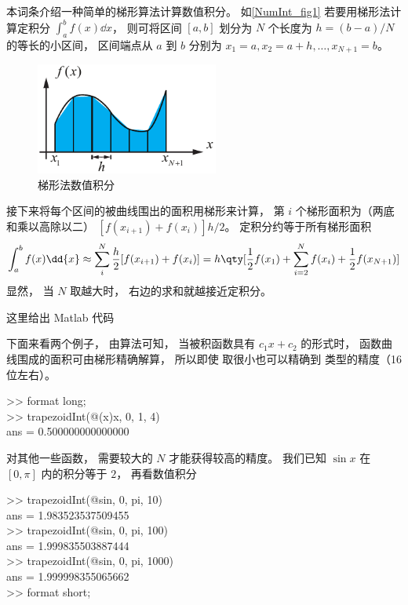 

本词条介绍一种简单的梯形算法计算数值积分。 如\autoref{NumInt_fig1} 若要用梯形法计算定积分 $\int_a^b f(x) \dd{x}$， 则可将区间 $[a, b]$ 划分为 $N$ 个长度为 $h = (b-a)/N$ 的等长的小区间， 区间端点从 $a$ 到 $b$ 分别为 $x_1 = a, x_2 = a + h, \dots, x_{N+1} = b$。

\begin{figure}[ht]
\centering
\includegraphics[width=6cm]{./figures/NumInt1.pdf}
\caption{梯形法数值积分} \label{NumInt_fig1}
\end{figure}

接下来将每个区间的被曲线围出的面积用梯形来计算， 第 $i$ 个梯形面积为（两底和乘以高除以二）
$[f(x_{i+1}) + f(x_i)]h/2$。 定积分约等于所有梯形面积
\begin{equation}
\int_a^b f(x) \dd{x} \approx \sum_i^N  \frac h2 [f(x_{i+1}) + f(x_i)]
= h\qty[ \frac12 f(x_1) + \sum_{i = 2}^N f(x_i) + \frac12 f(x_{N+1})]
\end{equation}
显然， 当 $N$ 取越大时， 右边的求和就越接近定积分。

这里给出 Matlab 代码

下面来看两个例子， 由算法可知， 当被积函数具有 $c_1 x + c_2$ 的形式时， 函数曲线围成的面积可由梯形精确解算， 所以即使  取很小也可以精确到  类型的精度（16 位左右）。
\begin{Command}
>> format {\color{string}long};\\
>> trapezoidInt(@(x)x, 0, 1, 4)\\
ans = 0.500000000000000
\end{Command}
对其他一些函数， 需要较大的 $N$ 才能获得较高的精度。 我们已知 $\sin x$ 在 $[0, \pi]$ 内的积分等于 $2$， 再看数值积分
\begin{Command}
>> trapezoidInt(@sin, 0, pi, 10)\\
ans = 1.983523537509455\\
>> trapezoidInt(@sin, 0, pi, 100)\\
ans = 1.999835503887444\\
>> trapezoidInt(@sin, 0, pi, 1000)\\
ans = 1.999998355065662\\
>> format {\color{string}short};
\end{Command}
